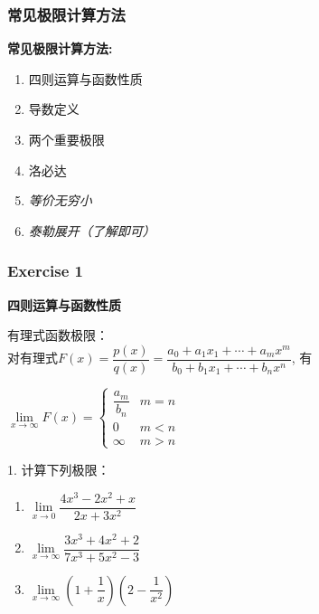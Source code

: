 \begin{frame}
	\frametitle{常见极限计算方法}
	\textbf{常见极限计算方法:}

	\begin{enumerate}
		\item 四则运算与函数性质\\
		\item 导数定义
		\item \alert{两个重要极限}\\
		\item \alert{洛必达}\\
		\item \textit{等价无穷小}\\
		\item \textit{泰勒展开（了解即可）}
	\end{enumerate}

\end{frame}


\begin{frame}
	\frametitle{Exercise 1}
	\textbf{四则运算与函数性质}

	有理式函数极限：\\

	对有理式$F(x) = \dfrac{p(x)}{q(x)}=\dfrac{a_0 + a_1 x_1 + \cdots + a_m x^m }{b_0 + b_1 x_1 + \cdots + b_n x^n}$, 有

	$\lim \limits_{x \to \infty} F(x) = \begin{cases}
			\dfrac{a_m}{b_n} & m = n \\
			0                & m < n \\
			\infty           & m > n
		\end{cases}
	$

	1. 计算下列极限：
	\begin{enumerate}
		\item $\lim\limits_{\textit{x} \to 0}\dfrac{4x^{3}-2x^{2}+x}{2x+3x^{2}}$
		\item $\lim\limits_{\textit{x} \to \infty}\dfrac{3x^3 + 4x^2 +2 }{7x^3+5x^2-3}$
		\item $\lim\limits_{\textit{x} \to \infty}(1+\dfrac{1}{x})(2-\dfrac{1}{x^{2}})$
	\end{enumerate}
\end{frame}

